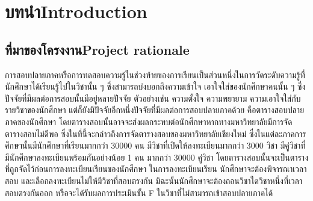 \chapter{\ifcpe บทนำ\else Introduction\fi}

\section{\ifcpe ที่มาของโครงงาน\else Project rationale\fi}
\label{sec:project_rationale}


การสอบปลายภาคหรือการทดสอบความรู้ในช่วงท้ายของการเรียนเป็นส่วนหนึ่งในการวัดระดับความรู้ที่นักศึกษาได้เรียนรู้ไปในวิชานั้น ๆ 
ซึ่งสามารถบ่งบอกถึงความเข้าใจ เอาใจใส่ของนักศึกษาคนนั้น ๆ ซึ่งปัจจัยที่มีผลต่อการสอบนั้นมีอยู่หลายปัจจัย 
ตัวอย่างเช่น ความตั้งใจ ความพยายาม ความเอาใจใส่กับรายวิชาของนักศึกษา แต่ก็ยังมีปัจจัยอีกหนึ่งปัจจัยที่มีผลต่อการสอบปลายภาคด้วย 
คือตารางสอบปลายภาคของนักศึกษา โดยตารางสอบนั้นอาจจะส่งผลกระทบต่อนักศึกษาหากทางมหาวิทยาลัยมีการจัดตารางสอบไม่ดีพอ 
ซึ่งในที่นี้จะกล่าวถึงการจัดตารางสอบของมหาวิทยาลัยเชียงใหม่ ซึ่งในแต่ละภาคการศึกษานั้นมีนักศึกษาที่เรียนมากกว่า 30000 คน
มีวิชาที่เปิดให้ลงทะเบียนมากกว่า 3000 วิชา มีคู่วิชาที่มีนักศึกษาลงทะเบียนพร้อมกันอย่างน้อย 1 คน มากกว่า 30000 คู่วิชา 
โดยตารางสอบนั้นจะเป็นตารางที่ถูกจัดไว้ก่อนการลงทะเบียนเรียนของนักศึกษา ในการลงทะเบียนเรียน นักศึกษาจะต้องพิจารณาเวลาสอบ และเลือกลงทะเบียนไม่ให้มีวิชาที่สอบตรงกัน 
มิฉะนั้นนักศึกษาจะต้องถอนวิชาใดวิชาหนึ่งที่เวลาสอบตรงกันออก หรือจะได้รับผลการประเมินขั้น F ในวิชาที่ไม่สามารถเข้าสอบปลายภาคได้


